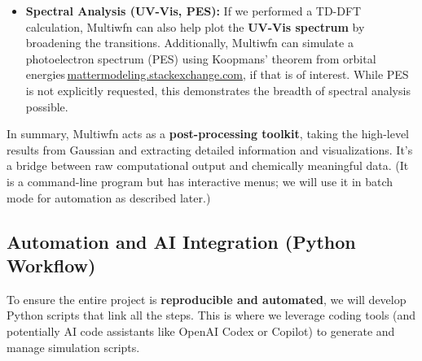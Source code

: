 \documentclass[11pt]{article}
\begin{document}
\begin{itemize}
  \item \textbf{Spectral Analysis (UV-Vis, PES):} If we performed a TD-DFT calculation, Multiwfn can also help plot the \textbf{UV-Vis spectrum} by broadening the transitions. Additionally, Multiwfn can simulate a photoelectron spectrum (PES) using Koopmans’ theorem from orbital energies\,\href{https://mattermodeling.stackexchange.com/questions/3493/quantifying-electronic-overlap\#:\~:text=\%3E\%20\%20\%20,Koopmans'\%20theorem\%20is\%20fully\%20supported}{mattermodeling.stackexchange.com}, if that is of interest. While PES is not explicitly requested, this demonstrates the breadth of spectral analysis possible.
\end{itemize}

In summary, Multiwfn acts as a \textbf{post-processing toolkit}, taking the high-level results from Gaussian and extracting detailed information and visualizations. It’s a bridge between raw computational output and chemically meaningful data. (It is a command-line program but has interactive menus; we will use it in batch mode for automation as described later.)

\subsection{Automation and AI Integration (Python Workflow)}
To ensure the entire project is \textbf{reproducible and automated}, we will develop Python scripts that link all the steps. This is where we leverage coding tools (and potentially AI code assistants like OpenAI Codex or Copilot) to generate and manage simulation scripts.
\end{document}
